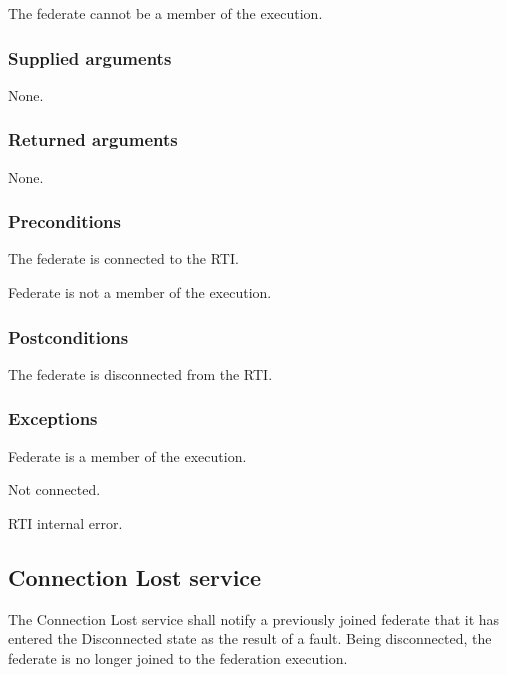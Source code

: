\begin{compactstdpage}
    The federate cannot be a member of the execution.

    \subsubsection{Supplied arguments}

    \begin{stdalphalist}
        \item None.
    \end{stdalphalist}

    \subsubsection{Returned arguments}

    \begin{stdalphalist}
        \item None.
    \end{stdalphalist}

    \subsubsection{Preconditions}

    \begin{stdalphalist}
        \item The federate is connected to the RTI.
        \item Federate is not a member of the execution.
    \end{stdalphalist}

    \subsubsection{Postconditions}

    \begin{stdalphalist}
        \item The federate is disconnected from the RTI.
    \end{stdalphalist}

    \subsubsection{Exceptions}

    \begin{stdalphalist}
        \item Federate is a member of the execution.
        \item Not connected.
        \item RTI internal error.
    \end{stdalphalist}

    \subsection{Connection Lost \rtiinitiated{} service}

    The Connection Lost \rtiinitiated{} service shall notify a previously joined federate that it has entered the Disconnected state as the result of a fault. Being disconnected, the federate is no longer joined to the federation execution.

\end{compactstdpage}
